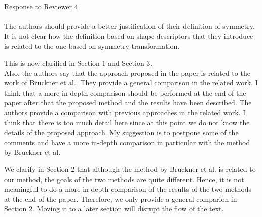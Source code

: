 \documentclass[10pt]{article}
\begin{document}
{\noindent \LARGE Response to Reviewer 4}\\\\
   The authors should provide a better justification of their definition of
   symmetry. It is not clear how the definition based on shape descriptors
   that they introduce is related to the one based on symmetry
   transformation. 

   {\color{blue}This is now clarified in Section 1 and Section 3.}\\

   Also, the authors say that the approach proposed in the paper is related
   to the work of Bruckner et al.. They provide a general comparison in the
   related work. I think that a more in-depth comparison should be performed
   at the end of the paper after that the proposed method and the results
   have been described.
   The authors provide a comparison with previous approaches in the related
   work. I think that there is too much detail here since at this point we
   do not know the details of the proposed approach. My suggestion is to
   postpone some of the comments and have a more in-depth comparison in
   particular with the method by Bruckner et al.

   {\color{blue}We clarify in Section 2 that although the method by Bruckner et al.
	   is related to our method, the goals of the two methods are quite different.
	   Hence, it is not meaningful to do a more in-depth comparison of the results
	   of the two methods at the end of the paper. Therefore, we only provide
	   a general comparion in Section 2. Moving it to a later section will
   disrupt the flow of the text.}
\end{document}
